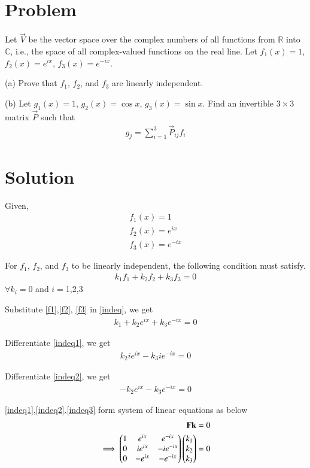 \documentclass[journal,12pt,twocolumn]{IEEEtran}
\begin{document}
\section{Problem}
Let $\vec{V}$ be the vector space over the complex numbers of all functions from $\mathbb{R}$ into $\mathbb{C}$, i.e., the space of all complex-valued functions on the real line. Let $f_1(x)=1$, $f_2(x)=e^{ix}$, $f_3(x)=e^{-ix}$.

(a) Prove that $f_1$, $f_2$, and $f_3$ are linearly independent.

(b) Let $g_1(x)=1$, $g_2(x)=\cos{x}$, $g_3(x)=\sin{x}$. Find an invertible $3\times3$ matrix $\vec{P}$ such that
\begin{align}
    g_j=\sum\limits_{i=1}^3 \vec{P}_{ij}f_i\label{eq}
\end{align}
\section{Solution}
Given,
\begin{align}
    f_1(x)=1\label{f1}\\
    f_2(x)=e^{ix}\label{f2}\\
    f_3(x)=e^{-ix}\label{f3}
\end{align}

For $f_1$, $f_2$, and $f_3$ to be linearly independent, the following condition must satisfy.
\begin{align}
    k_1f_1+k_2f_2+k_3f_3=0\label{indeq}
\end{align}
$\forall k_i=0$ and $i=$1,2,3

Substitute \eqref{f1},\eqref{f2}, \eqref{f3} in \eqref{indeq}, we get
\begin{align}
    k_1+k_2e^{ix}+k_3e^{-ix}=0\label{indeq1}
\end{align}

Differentiate \eqref{indeq1}, we get
\begin{align}
    k_2ie^{ix}-k_3ie^{-ix}=0\label{indeq2}
\end{align}

Differentiate \eqref{indeq2}, we get
\begin{align}
    -k_2e^{ix}-k_3e^{-ix}=0\label{indeq3}
\end{align}

\eqref{indeq1},\eqref{indeq2}.\eqref{indeq3} form system of linear equations as below
\begin{align}
    \mathbf{F}\mathbf{k}=0\\
    \implies\begin{pmatrix}1&e^{ix}&e^{-ix}\\0&ie^{ix}&-ie^{-ix}\\0&-e^{ix}&-e^{-ix}\end{pmatrix}\begin{pmatrix}k_1\\k_2\\k_3\end{pmatrix}=0
\end{align}
\end{document}
